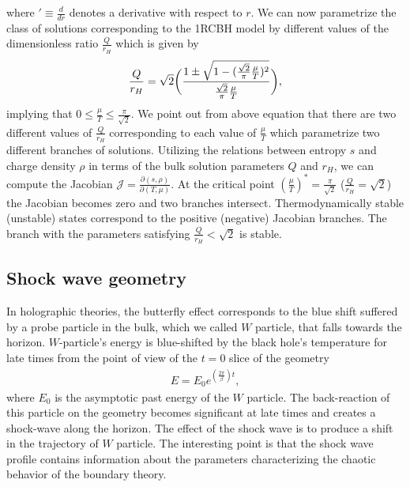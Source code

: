 \documentclass[preprintnumbers,aps,prd,longbibliography,nofootinbib,nobibnotes,amsmath,amssymb]{revtex4}
\begin{document}
where $' \equiv \frac{d}{dr}$ denotes a derivative with respect to $r$. We can now parametrize the class of solutions corresponding to the 1RCBH model by different values of the dimensionless ratio $\frac{Q}{r_H}$ which is given by  
\begin{align}
\frac{Q}{r_H}=\sqrt{2} \bigg{(} \frac{1\pm \sqrt{1-(\frac{\sqrt{2}}{\pi}\frac{\mu}{T})^2}}{\frac{\sqrt{2}}{\pi}\frac{\mu}{T}} \bigg{)},
\end{align}
implying that $0\leq\frac{\mu}{T}\leq\frac{\pi}{\sqrt{2}}$. We point out  from above equation that there are  two different values of $\frac{Q}{r_H}$ corresponding to each value of $\frac{\mu}{T}$ which parametrize two different branches of solutions. Utilizing the relations between entropy $s$ and charge density $\rho$ in terms of the bulk solution parameters $Q$ and $r_H$, we can compute the Jacobian $\mathcal{J}=\frac{\partial (s,\rho)}{\partial (T,\mu)}$. At the critical point $(\frac{\mu}{T})^*=\frac{\pi}{\sqrt{2}}$ ($\frac{Q}{r_H}=\sqrt{2}$)  the Jacobian becomes zero and  two branches intersect.  Thermodynamically stable (unstable) states correspond to the positive (negative) Jacobian branches. The branch with the parameters satisfying $\frac{Q}{r_H}<\sqrt{2}$ is stable.
 \subsection{Shock wave geometry}
 In holographic theories, the butterfly effect corresponds to the blue shift suffered by a probe particle in the bulk, which we called $W$ particle,  that falls towards the  horizon.  $W$-particle's energy is blue-shifted by the black hole's temperature for late times from the point of view of the $t=0$ slice of the geometry 
\begin{align}
E=E_{0}e^{(\frac{2\pi}{\beta})t},
\end{align}
where $E_{0}$ is the  asymptotic past energy of the $W$ particle. The back-reaction of this particle on the geometry   becomes significant at late times and  creates a shock-wave along the horizon. The effect of the shock wave is to produce a shift in the trajectory of $W$ particle. The interesting point is that the shock wave profile contains information about the parameters characterizing the chaotic behavior of the boundary theory.
\end{document}
